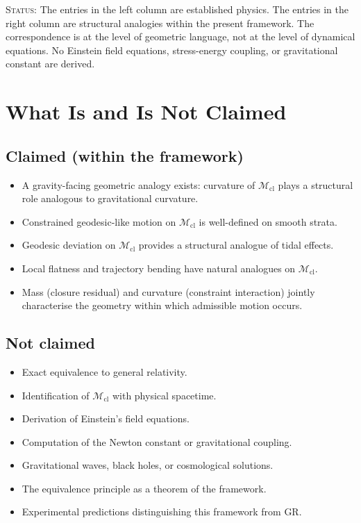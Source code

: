 \documentclass[12pt]{article}
\newcommand{\Mcl}{\mathcal{M}_{\mathrm{cl}}}
\begin{document}
\textsc{Status:} The entries in the left column are established physics. The entries in the right column are structural analogies within the present framework. The correspondence is at the level of geometric language, not at the level of dynamical equations. No Einstein field equations, stress-energy coupling, or gravitational constant are derived.

\section{What Is and Is Not Claimed}\label{sec:claims}

\subsection*{Claimed (within the framework)}

\begin{itemize}
    \item A gravity-facing geometric analogy exists: curvature of $\Mcl$ plays a structural role analogous to gravitational curvature.
    \item Constrained geodesic-like motion on $\Mcl$ is well-defined on smooth strata.
    \item Geodesic deviation on $\Mcl$ provides a structural analogue of tidal effects.
    \item Local flatness and trajectory bending have natural analogues on $\Mcl$.
    \item Mass (closure residual) and curvature (constraint interaction) jointly characterise the geometry within which admissible motion occurs.
\end{itemize}

\subsection*{Not claimed}

\begin{itemize}
    \item Exact equivalence to general relativity.
    \item Identification of $\Mcl$ with physical spacetime.
    \item Derivation of Einstein's field equations.
    \item Computation of the Newton constant or gravitational coupling.
    \item Gravitational waves, black holes, or cosmological solutions.
    \item The equivalence principle as a theorem of the framework.
    \item Experimental predictions distinguishing this framework from GR.
\end{itemize}
\end{document}

